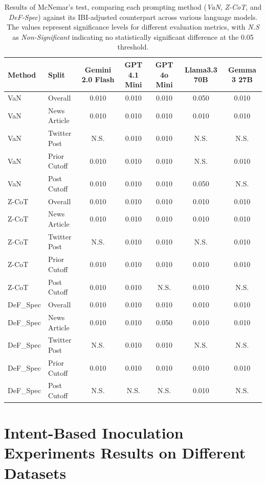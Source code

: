\documentclass[11pt]{article}
\begin{document}
\begin{table}[ht]
\centering
\small
\begin{tabular}{llccccc}
\toprule
Method & Split & Gemini 2.0 Flash & GPT 4.1 Mini & GPT 4o Mini & Llama3.3 70B & Gemma 3 27B \\
\midrule
 VaN       & Overall      & 0.010 & 0.010 & 0.010 & 0.050 & 0.010 \\
 VaN       & News Article & 0.010 & 0.010 & 0.010 & 0.010 & 0.010 \\
VaN       & Twitter Post & N.S.  & 0.010 & 0.010 & N.S.  & N.S.  \\
 VaN       & Prior Cutoff & 0.010 & 0.010 & 0.010 & N.S.  & 0.010 \\
 VaN       & Post Cutoff  & 0.010 & 0.010 & 0.010 & 0.050 & N.S.  \\
 Z-CoT     & Overall      & 0.010 & 0.010 & 0.010 & 0.010 & 0.010 \\
Z-CoT     & News Article & 0.010 & 0.010 & 0.010 & 0.010 & 0.010 \\
 Z-CoT     & Twitter Post & N.S.  & 0.010 & 0.010 & N.S.  & 0.010 \\
 Z-CoT     & Prior Cutoff & 0.010 & 0.010 & 0.010 & 0.010 & 0.010 \\
 Z-CoT     & Post Cutoff  & 0.010 & 0.010 & N.S.  & 0.010 & N.S.  \\
DeF\_Spec & Overall      & 0.010 & 0.010 & 0.010 & 0.010 & 0.010 \\
 DeF\_Spec & News Article & 0.010 & 0.010 & 0.050 & 0.010 & 0.010 \\
DeF\_Spec & Twitter Post & N.S.  & 0.010 & 0.010 & N.S.  & N.S.  \\
 DeF\_Spec & Prior Cutoff & 0.010 & 0.010 & 0.010 & 0.010 & 0.010 \\
 DeF\_Spec & Post Cutoff  & N.S.  & N.S.  & N.S.  & 0.010 & N.S.  \\
\bottomrule
\end{tabular}
     \caption{Results of McNemar's test, comparing each prompting method (\textit{VaN}, \textit{Z-CoT}, and \textit{DeF-Spec}) against its IBI-adjusted counterpart across various language models. The values represent significance levels for different evaluation metrics, with \textit{N.S} as \textit{Non-Significant} indicating no statistically significant difference at the 0.05 threshold.}
\label{tab:mc_nemars_test_int}
\end{table}


\section{Intent-Based Inoculation Experiments Results on Different Datasets}
\label{appendix:ibi_results_specific_datasets}
\end{document}
